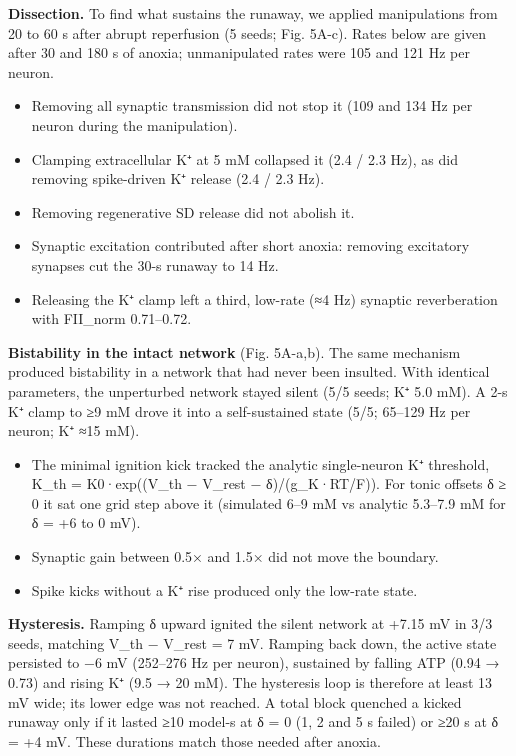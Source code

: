 \documentclass[11pt]{article}
\providecommand{\tightlist}{\setlength{\itemsep}{0pt}\setlength{\parskip}{0pt}}
\begin{document}
\textbf{Dissection.} To find what sustains the runaway, we applied manipulations from 20 to 60 s after abrupt reperfusion (5 seeds; Fig. 5A-c). Rates below are given after 30 and 180 s of anoxia; unmanipulated rates were 105 and 121 Hz per neuron.

\begin{itemize}
\tightlist
\item
  Removing all synaptic transmission did not stop it (109 and 134 Hz per neuron during the manipulation).
\item
  Clamping extracellular K⁺ at 5 mM collapsed it (2.4 / 2.3 Hz), as did removing spike-driven K⁺ release (2.4 / 2.3 Hz).
\item
  Removing regenerative SD release did not abolish it.
\item
  Synaptic excitation contributed after short anoxia: removing excitatory synapses cut the 30-s runaway to 14 Hz.
\item
  Releasing the K⁺ clamp left a third, low-rate (≈4 Hz) synaptic reverberation with FII\_norm 0.71--0.72.
\end{itemize}

\textbf{Bistability in the intact network} (Fig. 5A-a,b). The same mechanism produced bistability in a network that had never been insulted. With identical parameters, the unperturbed network stayed silent (5/5 seeds; K⁺ 5.0 mM). A 2-s K⁺ clamp to ≥9 mM drove it into a self-sustained state (5/5; 65--129 Hz per neuron; K⁺ ≈15 mM).

\begin{itemize}
\tightlist
\item
  The minimal ignition kick tracked the analytic single-neuron K⁺ threshold, K\_th = K0·exp((V\_th − V\_rest − δ)/(g\_K·RT/F)). For tonic offsets δ ≥ 0 it sat one grid step above it (simulated 6--9 mM vs analytic 5.3--7.9 mM for δ = +6 to 0 mV).
\item
  Synaptic gain between 0.5× and 1.5× did not move the boundary.
\item
  Spike kicks without a K⁺ rise produced only the low-rate state.
\end{itemize}

\textbf{Hysteresis.} Ramping δ upward ignited the silent network at +7.15 mV in 3/3 seeds, matching V\_th − V\_rest = 7 mV. Ramping back down, the active state persisted to −6 mV (252--276 Hz per neuron), sustained by falling ATP (0.94 → 0.73) and rising K⁺ (9.5 → 20 mM). The hysteresis loop is therefore at least 13 mV wide; its lower edge was not reached. A total block quenched a kicked runaway only if it lasted ≥10 model-s at δ = 0 (1, 2 and 5 s failed) or ≥20 s at δ = +4 mV. These durations match those needed after anoxia.
\end{document}
